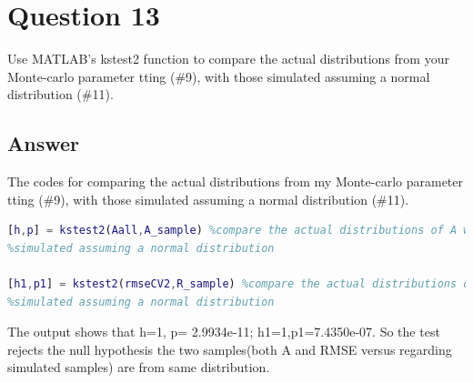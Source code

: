 \documentclass[
	12pt, %
]{fphw}
\begin{document}
 \section*{Question 13 }

\begin{problem}
Use MATLAB's kstest2 function to compare the actual distributions from your Monte-carlo parameter
tting (\#9), with those simulated assuming a normal distribution (\#11).	
\end{problem}

\subsection*{Answer}

The codes for comparing the actual distributions from my Monte-carlo parameter
tting (\#9), with those simulated assuming a normal distribution (\#11).

\begin{lstlisting}[language=Matlab,escapeinside=``]
[h,p] = kstest2(Aall,A_sample) %compare the actual distributions of A with 
%simulated assuming a normal distribution

[h1,p1] = kstest2(rmseCV2,R_sample) %compare the actual distributions of RMSE with 
%simulated assuming a normal distribution
\end{lstlisting}

The output shows that h=1, p= 2.9934e-11; h1=1,p1=7.4350e-07. So the test rejects the null hypothesis the two samples(both A and RMSE versus regarding simulated samples) are from same distribution.
\end{document}
